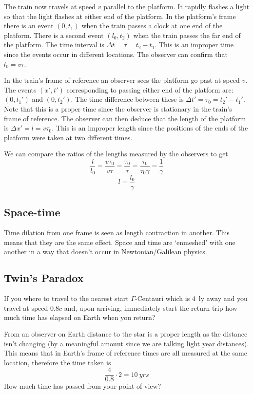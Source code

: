 \documentclass{article}
\begin{document}
    The train now travels at speed \(v\) parallel to the platform. 
    It rapidly flashes a light so that the light flashes at either end of the platform.
    In the platform's frame there is an event \((0, t_1)\) when the train passes a clock at one end of the platform.
    There is a second event \((l_0, t_2)\) when the train passes the far end of the platform.
    The time interval is \(\Delta t = \tau = t_2 - t_1\).
    This is an improper time since the events occur in different locations.
    The observer can confirm that \(l_0 = v\tau\).
    
    In the train's frame of reference an observer sees the platform go past at speed \(v\). 
    The events \((x', t')\) corresponding to passing either end of the platform are: \((0, t_1')\) and \((0, t_2')\). 
    The time difference between these is \(\Delta t' = \tau_0 = t_2' - t_1'\).
    Note that this is a proper time since the observer is stationary in the train's frame of reference.
    The observer can then deduce that the length of the platform is \(\Delta x' = l = v\tau_0\).
    This is an improper length since the positions of the ends of the platform were taken at two different times.
    
    We can compare the ratios of the lengths measured by the observers to get
    \[\frac{l}{l_0} = \frac{v\tau_0}{v\tau} = \frac{\tau_0}{\tau} = \frac{\tau_0}{\tau_0\gamma} = \frac{1}{\gamma}\]
    \[l = \frac{l_0}{\gamma}\]
    
    \subsection{Space-time}
    Time dilation from one frame is seen as length contraction in another. 
    This means that they are the same effect. Space and time are `enmeshed' with one another in a way that doesn't occur in Newtonian/Galilean physics.
    
    \subsection{Twin's Paradox}
    If you where to travel to the nearest start \(\Gamma\)-Centauri which is \SI{4}{ly} away and you travel at speed \(0.8c\) and, upon arriving, immediately start the return trip how much time has elapsed on Earth when you return?
    
    From an observer on Earth distance to the star is a proper length as the distance isn't changing (by a meaningful amount since we are talking light year distances). 
    This means that in Earth's frame of reference times are all measured at the same location, therefore the time taken is
    \[\frac{4}{0.8}\cdot 2 = \SI{10}{yrs}\]
    How much time has passed from your point of view?
    
\end{document}
